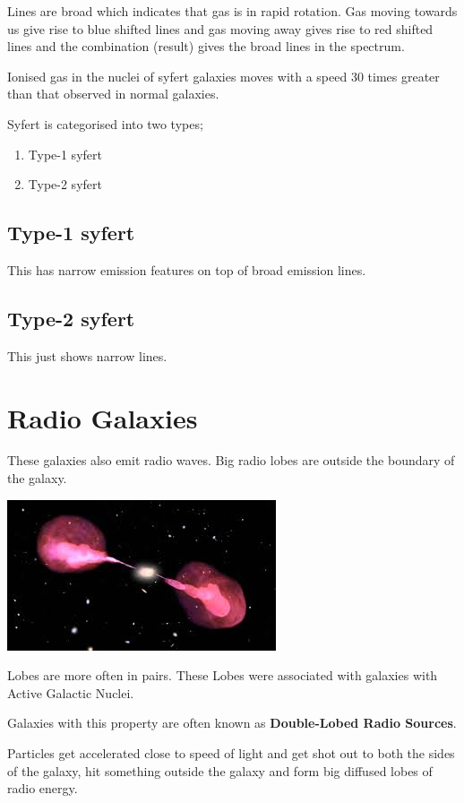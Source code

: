 \documentclass{book}
\begin{document}
Lines are broad which indicates that gas is in rapid rotation.
Gas moving towards us give rise to blue shifted lines and gas moving away gives rise to red shifted lines and the combination (result) gives the broad lines in the spectrum.

Ionised gas in the nuclei of syfert galaxies moves with a speed 30 times greater than that observed in normal galaxies.

Syfert is categorised into two types;
\begin{enumerate}
\item Type-1 syfert
\item Type-2 syfert
\end{enumerate}

\subsection{Type-1 syfert}
This has narrow emission features on top of broad emission lines.

\subsection{Type-2 syfert}
This just shows narrow lines.


\section{Radio Galaxies}
These galaxies also emit radio waves.
Big radio lobes are outside the boundary of the galaxy.


\includegraphics{radio.jpeg}


Lobes are more often in pairs.
These Lobes were associated with galaxies with Active Galactic Nuclei.

Galaxies with this property are often known as \textbf{Double-Lobed Radio Sources}.

Particles get accelerated close to speed of light and get shot out to both the sides of the galaxy, hit something outside the galaxy and form big diffused lobes of radio energy.
\end{document}
